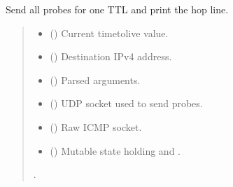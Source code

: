 \documentclass[a4paper,11pt,english,openany,oneside]{sphinxmanual}
\begin{document}
\begin{fulllineitems}
\label{\detokenize{traceroute:my_traceroute.trace_hop}}
\pysigstartsignatures
{}
\pysigstopsignatures
\sphinxAtStartPar
Send all probes for one TTL and print the hop line.
\begin{quote}\begin{description}
\begin{itemize}
\item {} 
\sphinxAtStartPar
{} () \textendash{} Current time\sphinxhyphen{}to\sphinxhyphen{}live value.

\item {} 
\sphinxAtStartPar
{} () \textendash{} Destination IPv4 address.

\item {} 
\sphinxAtStartPar
{} () \textendash{} Parsed arguments.

\item {} 
\sphinxAtStartPar
{} () \textendash{} UDP socket used to send probes.

\item {} 
\sphinxAtStartPar
{} () \textendash{} Raw ICMP socket.

\item {} 
\sphinxAtStartPar
{} () \textendash{} Mutable state holding  and .

\end{itemize}

\sphinxAtStartPar
{}.


\end{description}
\end{quote}
\end{fulllineitems}
\end{document}
